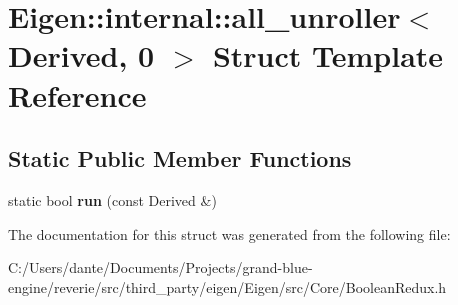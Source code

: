 \hypertarget{struct_eigen_1_1internal_1_1all__unroller_3_01_derived_00_010_01_4}{}\section{Eigen\+::internal\+::all\+\_\+unroller$<$ Derived, 0 $>$ Struct Template Reference}
\label{struct_eigen_1_1internal_1_1all__unroller_3_01_derived_00_010_01_4}
\subsection*{Static Public Member Functions}
\begin{DoxyCompactItemize}
\item 
\mbox{\label{struct_eigen_1_1internal_1_1all__unroller_3_01_derived_00_010_01_4_a130d49c75b6aa6c1b97faee7d9a1afc8}} 
static bool {\bfseries run} (const Derived \&)
\end{DoxyCompactItemize}


The documentation for this struct was generated from the following file\+:\begin{DoxyCompactItemize}
\item 
C\+:/\+Users/dante/\+Documents/\+Projects/grand-\/blue-\/engine/reverie/src/third\+\_\+party/eigen/\+Eigen/src/\+Core/Boolean\+Redux.\+h\end{DoxyCompactItemize}
